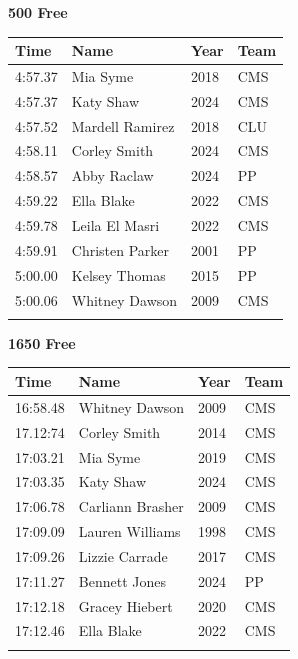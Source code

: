 \vspace{1.2em}
\noindent\begin{minipage}[t]{0.98\textwidth}
\centering
\textbf{\textcolor{teamprimary}{500 Free}}\par
\vspace{0.5em}
\centering
\small
\renewcommand{\arraystretch}{1.0}
\setlength{\tabcolsep}{4pt}
\begin{tabular}{@{}p{2.5cm}p{4.5cm}p{1.5cm}p{2.5cm}@{}}
\toprule
\textbf{Time} & \textbf{Name} & \textbf{Year} & \textbf{Team} \\
\midrule
4:57.37 & Mia Syme & 2018 & CMS \\
4:57.37 & Katy Shaw & 2024 & CMS \\
4:57.52 & Mardell Ramirez & 2018 & CLU \\
4:58.11 & Corley Smith & 2024 & CMS \\
4:58.57 & Abby Raclaw & 2024 & PP \\
4:59.22 & Ella Blake & 2022 & CMS \\
4:59.78 & Leila El Masri & 2022 & CMS \\
4:59.91 & Christen Parker & 2001 & PP \\
5:00.00 & Kelsey Thomas & 2015 & PP \\
5:00.06 & Whitney Dawson & 2009 & CMS \\
\bottomrule
\vspace{0.5em}
\end{tabular}
\end{minipage}
\vspace{1.2em}
\noindent\begin{minipage}[t]{0.98\textwidth}
\centering
\textbf{\textcolor{teamprimary}{1650 Free}}\par
\vspace{0.5em}
\centering
\small
\renewcommand{\arraystretch}{1.0}
\setlength{\tabcolsep}{4pt}
\begin{tabular}{@{}p{2.5cm}p{4.5cm}p{1.5cm}p{2.5cm}@{}}
\toprule
\textbf{Time} & \textbf{Name} & \textbf{Year} & \textbf{Team} \\
\midrule
16:58.48 & Whitney Dawson & 2009 & CMS \\
17.12:74 & Corley Smith & 2014 & CMS \\
17:03.21 & Mia Syme & 2019 & CMS \\
17:03.35 & Katy Shaw & 2024 & CMS \\
17:06.78 & Carliann Brasher & 2009 & CMS \\
17:09.09 & Lauren Williams & 1998 & CMS \\
17:09.26 & Lizzie Carrade & 2017 & CMS \\
17:11.27 & Bennett Jones & 2024 & PP \\
17:12.18 & Gracey Hiebert & 2020 & CMS \\
17:12.46 & Ella Blake & 2022 & CMS \\
\bottomrule
\vspace{0.5em}
\end{tabular}
\end{minipage}
